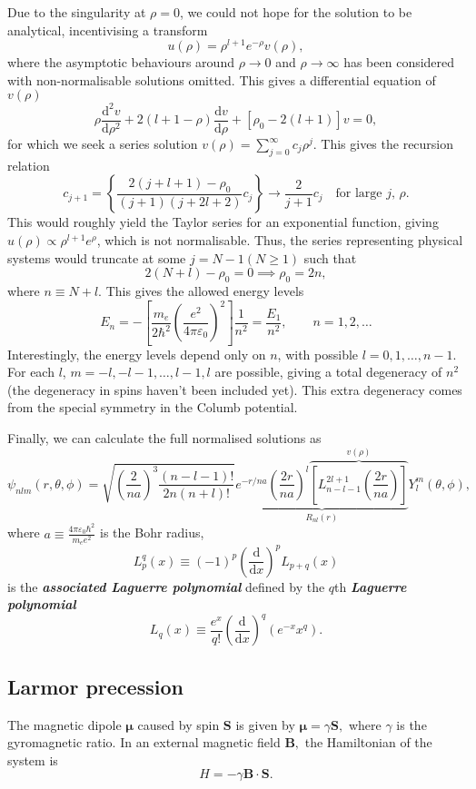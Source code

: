 \documentclass{article}
\theoremstyle{nonumberplain}
\begin{document}
Due to the singularity at $\rho =0$, we could not hope for the solution to be analytical, incentivising a transform
\[
    u(\rho ) = \rho ^{l+1} e^{-\rho } v(\rho ),
\]
where the asymptotic behaviours around $\rho \to 0$ and $\rho \to \infty $ has been considered with non-normalisable solutions omitted. This gives a differential equation of $v(\rho )$
\[
    \rho \frac{\mathrm{d}^{2} v}{\mathrm{d}\rho ^{2} } + 2(l + 1 - \rho ) \frac{\mathrm{d}v}{\mathrm{d}\rho } +
    [\rho _0 - 2(l + 1)] v = 0,
\]
for which we seek a series solution 
\(
    v(\rho ) = \sum\limits_{j=0}^{\infty} c_j \rho ^j. 
\) 
This gives the recursion relation 
\[
    c_{j+1} = \left \{ 
        \frac{2(j+l+1)-\rho _0}{(j+1)(j+2l+2)} c_j
    \right\} \to \frac{2}{j+1} c_j \quad \text{for large $j$, $\rho$}.
\]
This would roughly yield the Taylor series for an exponential function, giving $u(\rho) \propto \rho ^{l+1} e^{\rho }$, which is not normalisable. Thus, the series representing physical systems would truncate at some $j=N-1(N \geq 1)$ such that 
\[
    2(N+l) - \rho _0 = 0 
    \implies \rho _0 = 2n,
\]
where $n \equiv N+l.$ This gives the allowed energy levels
\[ \boxed{
    E_n = - \left[ 
        \frac{m_e}{2 \hbar ^{2} } \left( 
            \frac{e^{2} }{4 \pi  \varepsilon _0 }
        \right)^{2} 
    \right] \frac{1}{n^{2} } = \frac{E_1}{n^{2} }, \qquad n = 1, 2, \ldots   }
\]
Interestingly, the energy levels depend only on $n$, with possible $l = 0, 1, \ldots , n-1 $. For each $l$, $m = -l, -l-1, \ldots , l-1, l$ are possible, giving a total degeneracy of $n^2$ (the degeneracy in spins haven't been included yet). This extra degeneracy comes from the special symmetry in the Columb potential. 

Finally, we can calculate the full normalised solutions as
\[
    \boxed{
        \psi_{nlm}(r,\theta ,\phi ) = 
        \sqrt{\left( \frac{2}{n a}\right)^3 \frac{(n-l-1)!}{2n (n+l)!}} 
        \underbrace{e^{-r/na}\left( \frac{2r}{na}\right)^l \overbrace{\left[ 
        L_{n-l-1}^{2l+1} \left( \frac{2r}{na}\right)
        \right]}^{v(\rho )}}_{R_{nl}(r)}  Y_l^m(\theta , \phi ),
    }
\]
where $a \equiv \frac{4 \pi \varepsilon_0 \hbar ^{2} }{m_e e^{2} }$ is the Bohr radius, 
\[
    L_p^q(x) \equiv (-1)^p \left( \frac{\mathrm{d}}{\mathrm{d}x} \right)^p L_{p+q}(x)
\]
is the \textit{\textbf{associated Laguerre polynomial}} defined by the $q$th \textit{\textbf{Laguerre polynomial}} 
\[
    L_q(x) \equiv \frac{e^x}{q!} \left( \frac{\mathrm{d}}{\mathrm{d}x}  \right)^q \left( e^{-x} x^q\right). 
\]  
\subsection{Larmor precession} 
The magnetic dipole $\mathbf{\mu}  $ caused by spin $\mathbf{S} $ is given by $\mathbf{\mu}   = \gamma  \mathbf{S}, $ where $\gamma $ is the gyromagnetic ratio. In an external magnetic field $\mathbf{B},$ the Hamiltonian of the system is 
\[
    H = -\gamma \mathbf{B} \cdot \mathbf{S}. 
\] 
\end{document}
